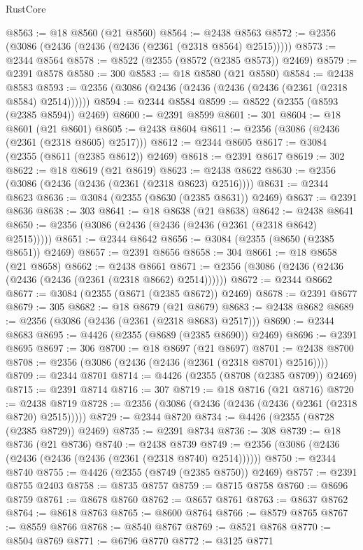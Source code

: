 \begin{lexlean}{RustCore}
\begin{coremodule}
@8563 := @18 @8560 (@21 @8560)
@8564 := @2438 @8563
@8572 := @2356 (@3086 (@2436 (@2436 (@2436 (@2361 (@2318 @8564) @2515)))))
@8573 := @2344 @8564
@8578 := @8522 (@2355 (@8572 (@2385 @8573)) @2469)
@8579 := @2391 @8578
@8580 := 300
@8583 := @18 @8580 (@21 @8580)
@8584 := @2438 @8583
@8593 := @2356 (@3086 (@2436 (@2436 (@2436 (@2436 (@2361 (@2318 @8584) @2514))))))
@8594 := @2344 @8584
@8599 := @8522 (@2355 (@8593 (@2385 @8594)) @2469)
@8600 := @2391 @8599
@8601 := 301
@8604 := @18 @8601 (@21 @8601)
@8605 := @2438 @8604
@8611 := @2356 (@3086 (@2436 (@2361 (@2318 @8605) @2517)))
@8612 := @2344 @8605
@8617 := @3084 (@2355 (@8611 (@2385 @8612)) @2469)
@8618 := @2391 @8617
@8619 := 302
@8622 := @18 @8619 (@21 @8619)
@8623 := @2438 @8622
@8630 := @2356 (@3086 (@2436 (@2436 (@2361 (@2318 @8623) @2516))))
@8631 := @2344 @8623
@8636 := @3084 (@2355 (@8630 (@2385 @8631)) @2469)
@8637 := @2391 @8636
@8638 := 303
@8641 := @18 @8638 (@21 @8638)
@8642 := @2438 @8641
@8650 := @2356 (@3086 (@2436 (@2436 (@2436 (@2361 (@2318 @8642) @2515)))))
@8651 := @2344 @8642
@8656 := @3084 (@2355 (@8650 (@2385 @8651)) @2469)
@8657 := @2391 @8656
@8658 := 304
@8661 := @18 @8658 (@21 @8658)
@8662 := @2438 @8661
@8671 := @2356 (@3086 (@2436 (@2436 (@2436 (@2436 (@2361 (@2318 @8662) @2514))))))
@8672 := @2344 @8662
@8677 := @3084 (@2355 (@8671 (@2385 @8672)) @2469)
@8678 := @2391 @8677
@8679 := 305
@8682 := @18 @8679 (@21 @8679)
@8683 := @2438 @8682
@8689 := @2356 (@3086 (@2436 (@2361 (@2318 @8683) @2517)))
@8690 := @2344 @8683
@8695 := @4426 (@2355 (@8689 (@2385 @8690)) @2469)
@8696 := @2391 @8695
@8697 := 306
@8700 := @18 @8697 (@21 @8697)
@8701 := @2438 @8700
@8708 := @2356 (@3086 (@2436 (@2436 (@2361 (@2318 @8701) @2516))))
@8709 := @2344 @8701
@8714 := @4426 (@2355 (@8708 (@2385 @8709)) @2469)
@8715 := @2391 @8714
@8716 := 307
@8719 := @18 @8716 (@21 @8716)
@8720 := @2438 @8719
@8728 := @2356 (@3086 (@2436 (@2436 (@2436 (@2361 (@2318 @8720) @2515)))))
@8729 := @2344 @8720
@8734 := @4426 (@2355 (@8728 (@2385 @8729)) @2469)
@8735 := @2391 @8734
@8736 := 308
@8739 := @18 @8736 (@21 @8736)
@8740 := @2438 @8739
@8749 := @2356 (@3086 (@2436 (@2436 (@2436 (@2436 (@2361 (@2318 @8740) @2514))))))
@8750 := @2344 @8740
@8755 := @4426 (@2355 (@8749 (@2385 @8750)) @2469)
@8757 := @2391 @8755 @2403
@8758 := @8735 @8757
@8759 := @8715 @8758
@8760 := @8696 @8759
@8761 := @8678 @8760
@8762 := @8657 @8761
@8763 := @8637 @8762
@8764 := @8618 @8763
@8765 := @8600 @8764
@8766 := @8579 @8765
@8767 := @8559 @8766
@8768 := @8540 @8767
@8769 := @8521 @8768
@8770 := @8504 @8769
@8771 := @6796 @8770
@8772 := @3125 @8771

\end{coremodule}
\end{lexlean}
